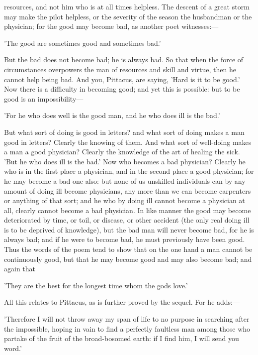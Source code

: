 \documentclass[11pt,letter]{article}
\begin{document}
resources, and not him who is at all times helpless. The descent of a great storm may make the pilot helpless, or the severity of the season the husbandman or the physician; for the good may become bad, as another poet witnesses:—

\par  'The good are sometimes good and sometimes bad.'

\par  But the bad does not become bad; he is always bad. So that when the force of circumstances overpowers the man of resources and skill and virtue, then he cannot help being bad. And you, Pittacus, are saying, 'Hard is it to be good.' Now there is a difficulty in becoming good; and yet this is possible: but to be good is an impossibility—

\par  'For he who does well is the good man, and he who does ill is the bad.'

\par  But what sort of doing is good in letters? and what sort of doing makes a man good in letters? Clearly the knowing of them. And what sort of well-doing makes a man a good physician? Clearly the knowledge of the art of healing the sick. 'But he who does ill is the bad.' Now who becomes a bad physician? Clearly he who is in the first place a physician, and in the second place a good physician; for he may become a bad one also: but none of us unskilled individuals can by any amount of doing ill become physicians, any more than we can become carpenters or anything of that sort; and he who by doing ill cannot become a physician at all, clearly cannot become a bad physician. In like manner the good may become deteriorated by time, or toil, or disease, or other accident (the only real doing ill is to be deprived of knowledge), but the bad man will never become bad, for he is always bad; and if he were to become bad, he must previously have been good. Thus the words of the poem tend to show that on the one hand a man cannot be continuously good, but that he may become good and may also become bad; and again that

\par  'They are the best for the longest time whom the gods love.'

\par  All this relates to Pittacus, as is further proved by the sequel. For he adds:—

\par  'Therefore I will not throw away my span of life to no purpose in searching after the impossible, hoping in vain to find a perfectly faultless man among those who partake of the fruit of the broad-bosomed earth: if I find him, I will send you word.'
\end{document}
